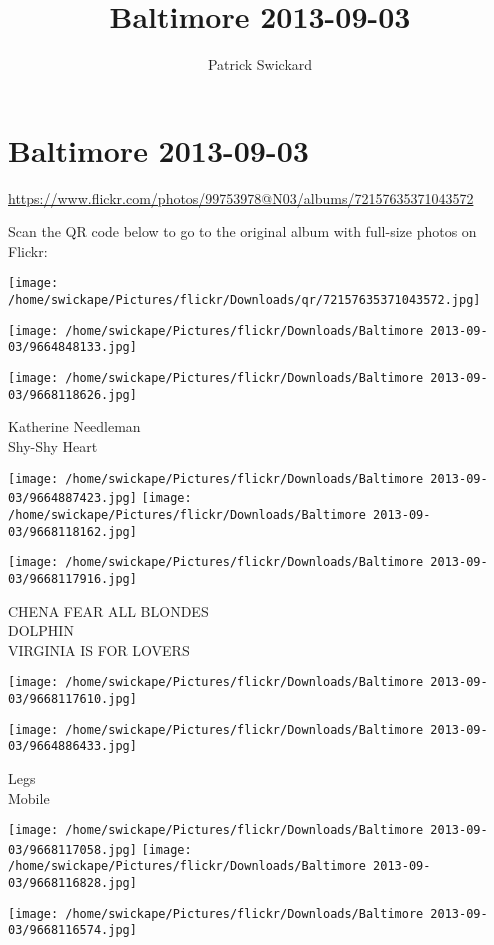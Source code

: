 \documentclass[10pt,letterpaper]{article}
\title{Baltimore 2013-09-03}
\author{Patrick Swickard}
\date{}
\begin{document}
\section*{Baltimore 2013-09-03}

\url{https://www.flickr.com/photos/99753978@N03/albums/72157635371043572}

Scan the QR code below to go to the original album with full-size photos on Flickr:

\texttt{[image: /home/swickape/Pictures/flickr/Downloads/qr/72157635371043572.jpg]}
\pagebreak

\texttt{[image: /home/swickape/Pictures/flickr/Downloads/Baltimore 2013-09-03/9664848133.jpg]}

\vspace{0.25in}
\texttt{[image: /home/swickape/Pictures/flickr/Downloads/Baltimore 2013-09-03/9668118626.jpg]}

Katherine Needleman\\
Shy{-}Shy Heart
\pagebreak

\texttt{[image: /home/swickape/Pictures/flickr/Downloads/Baltimore 2013-09-03/9664887423.jpg]}
\texttt{[image: /home/swickape/Pictures/flickr/Downloads/Baltimore 2013-09-03/9668118162.jpg]}

\vspace{0.25in}
\texttt{[image: /home/swickape/Pictures/flickr/Downloads/Baltimore 2013-09-03/9668117916.jpg]}

CHENA FEAR ALL BLONDES\\
DOLPHIN\\
VIRGINIA IS FOR LOVERS
\pagebreak

\texttt{[image: /home/swickape/Pictures/flickr/Downloads/Baltimore 2013-09-03/9668117610.jpg]}

\vspace{0.25in}
\texttt{[image: /home/swickape/Pictures/flickr/Downloads/Baltimore 2013-09-03/9664886433.jpg]}

Legs\\
Mobile
\pagebreak

\texttt{[image: /home/swickape/Pictures/flickr/Downloads/Baltimore 2013-09-03/9668117058.jpg]}
\texttt{[image: /home/swickape/Pictures/flickr/Downloads/Baltimore 2013-09-03/9668116828.jpg]}

\vspace{0.25in}
\texttt{[image: /home/swickape/Pictures/flickr/Downloads/Baltimore 2013-09-03/9668116574.jpg]}
\end{document}

